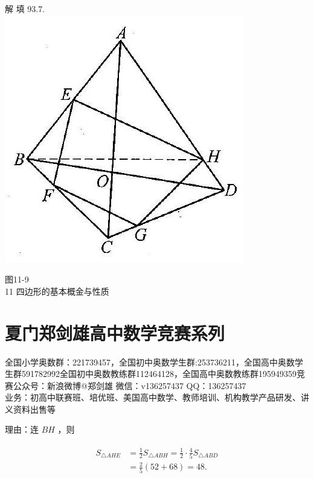 \documentclass[10pt]{article}
\begin{document}
解 填 93.7.\\
\includegraphics[max width=\textwidth, center]{2024_10_30_2c8f45efd4a519b08e1ag-105(1)}

图11-9\\
11 四边形的基本概金与性质

\section*{夏门郑剑雄高中数学竞赛系列}
全国小学奥数群：221739457，全国初中奥数学生群:253736211，全国高中奥数学生群591782992全国初中奥数教练群112464128，全国高中奥数教练群195949359竞赛公众号：新浪微博@郑剑雄 微信：v136257437 QQ：136257437\\
业务：初高中联赛班、培优班、美国高中数学、教师培训、机构教学产品研发、讲义资料出售等

理由：连 $B H$ ，则

\begin{align*}
\begin{aligned}
S_{\triangle A H E} & =\frac{1}{2} S_{\triangle A B H}=\frac{1}{2} \cdot \frac{4}{5} S_{\triangle A B D} \\
& =\frac{2}{5}(52+68)=48 .
\end{aligned}
\end{align*}
\end{document}
